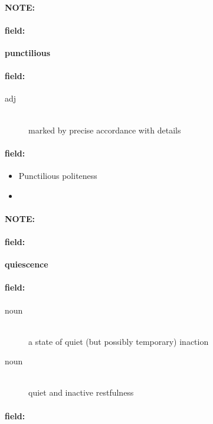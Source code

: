 \documentclass[12pt]{article}
\newenvironment{note}{\paragraph{NOTE:}}{}
\newenvironment{field}{\paragraph{field:}}{}
\begin{document}
\begin{note}
\begin{field}
\textbf{\large punctilious}
\end{field}


\begin{field}
\begin{description}
\item[adj] \hfill \\ 
marked by precise accordance with details

\end{description}
\end{field}

\begin{field}
\begin{itemize}
\item Punctilious politeness
\item 
\end{itemize}
\end{field}
\end{note}
\begin{note}
\begin{field}
\textbf{\large quiescence}
\end{field}


\begin{field}
\begin{description}
\item[noun] \hfill \\ 
a state of quiet (but possibly temporary) inaction

\item[noun] \hfill \\ 
quiet and inactive restfulness

\end{description}
\end{field}

\begin{field}
\end{field}
\end{note}
\end{document}
